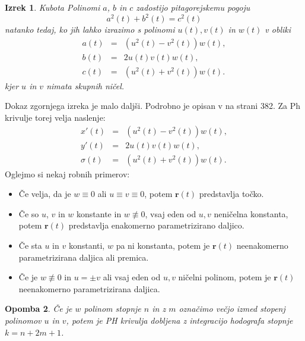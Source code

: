 \documentclass[12pt]{article}
\newtheorem{Izrek}{{\sc Izrek}}[section]
\newtheorem{Opomba}[Izrek]{{\sc Opomba}}
\begin{document}
\begin{Izrek}{Kubota}\newline
	\label{Kubota}
	Polinomi $a$, $b$ in $c$ zadostijo pitagorejskemu pogoju
	$$a^2(t) + b^2(t) = c^2(t)$$
	natanko tedaj, ko jih lahko izrazimo s polinomi $u(t), v(t)$ in $w(t)$ v obliki
	\begin{eqnarray}
		a(t) &=&(u^2(t) - v^2(t))w(t),\nonumber\\
		b(t) &=& 2u(t)v(t)w(t),\nonumber\\
		c(t) &=& (u^2(t) + v^2(t))w(t).\nonumber
	\end{eqnarray}
	kjer $u$ in $v$ nimata skupnih ničel.
\end{Izrek}
\noindent Dokaz zgornjega izreka je malo daljši. Podrobno je opisan v  \cite{knjiga} na strani 382.
Za Ph krivulje torej velja naslenje:
\begin{eqnarray}
	x'(t) &=&(u^2(t) - v^2(t))w(t),\nonumber\\
	y'(t) &=& 2u(t)v(t)w(t),\nonumber\\
	\sigma(t) &=& (u^2(t) + v^2(t))w(t).\nonumber
\end{eqnarray}
\noindent Oglejmo si nekaj robnih primerov:
\begin{itemize}
	\item Če velja, da je $w\equiv0$ ali $u\equiv v \equiv 0$, potem $\textbf{r}(t)$ predstavlja točko.
	\item Če so $u$, $v$ in $w$ konstante in $w \not\equiv 0$, vsaj eden od $u, v$ neničelna konstanta, potem $\textbf{r}(t)$ predstavlja enakomerno parametrizirano daljico.
	\item Če sta $u$ in $v$ konstanti, $w$ pa ni konstanta, potem je  $\textbf{r}(t)$ neenakomerno parametrizirana daljica ali premica.
	\item Če je $w \not\equiv 0$ in $u = \pm v$ ali vsaj eden od $u, v$ ničelni polinom, 
	potem je $\textbf{r}(t)$ neenakomerno parametrizirana daljica.
\end{itemize}
\begin{Opomba}
	\label{Stopnja}
	Če je $w$ polinom stopnje $n$ in z $m$ označimo večjo izmed stopenj polinomov $u$ in $v$, 
potem je PH krivulja dobljena z integracijo hodografa stopnje $k = n + 2m + 1$.
\end{Opomba}
\end{document}
